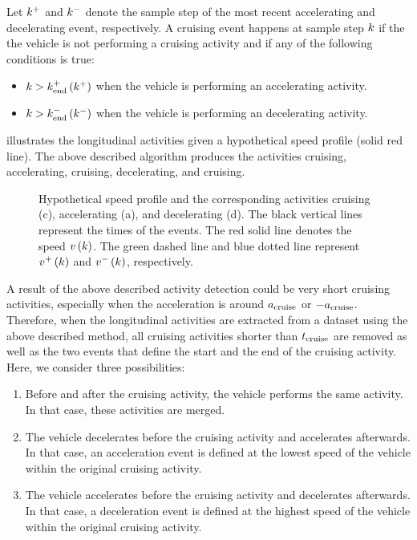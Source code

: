 Let $k^{+}$ and $k^{-}$ denote the sample step of the most recent accelerating and decelerating event, respectively. A cruising event happens at sample step $k$ if the the vehicle is not performing a cruising activity and if any of the following conditions is true:
\begin{itemize}
	\item $k > k_{\mathrm{end}}^{+}\left(k^{+}\right)$ when the vehicle is performing an accelerating activity.
	\item $k > k_{\mathrm{end}}^{-}\left(k^{-}\right)$ when the vehicle is performing an decelerating activity.
\end{itemize}

\cstarta%
 illustrates the longitudinal activities given a hypothetical speed profile (solid red line). The above described algorithm produces the activities cruising, accelerating, cruising, decelerating, and cruising.
\cenda

\setlength{\figurewidth}{\linewidth}
\setlength{\figureheight}{0.7\linewidth}
\begin{figure}
	\centering
	
	\caption{\cstarta Hypothetical speed profile and the corresponding activities cruising (c), accelerating (a), and decelerating (d). The black vertical lines represent the times of the events. The red solid line denotes the speed $v\left(k\right)$. The green dashed line and blue dotted line represent $v^{+}\left(k\right)$ and $v^{-}\left(k\right)$, respectively.\cenda}
	\label{fig:longitudinal activities}
\end{figure}

A result of the above described activity detection could be very short cruising activities, especially when the acceleration is around $a_\mathrm{cruise}$ or $-a_\mathrm{cruise}$. Therefore, when the longitudinal activities are extracted from a dataset using the above described method, all cruising activities shorter than $t_\mathrm{cruise}$ are removed as well as the two events that define the start and the end of the cruising activity. Here, we consider three possibilities:
\begin{enumerate}
	\item Before and after the cruising activity, the vehicle performs the same activity. In that case, these activities are merged.
	\item The vehicle decelerates before the cruising activity and accelerates afterwards. In that case, an acceleration event is defined at the lowest speed of the vehicle within the original cruising activity.
	\item The vehicle accelerates before the cruising activity and decelerates afterwards. In that case, a deceleration event is defined at the highest speed of the vehicle within the original cruising activity.
\end{enumerate}



